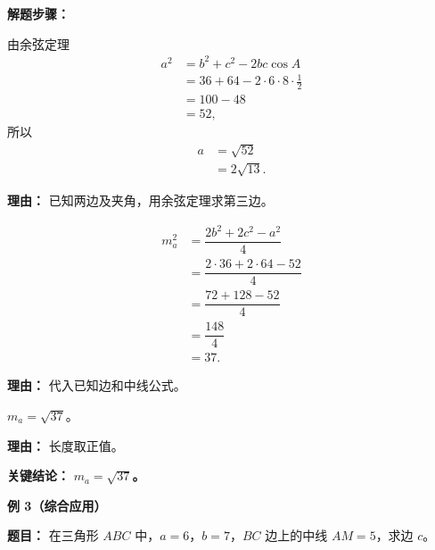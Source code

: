 \begin{examplebox}
	\textbf{\textcolor{CExample}{解题步骤：}}
	\begin{description}[style=nextline, leftmargin=2.8em, labelsep=0.5em, itemsep=0.45em]
		\item[\textbf{第一步（求第三边）：}] 由余弦定理
			\[
				\begin{aligned}
					a^2 &= b^2 + c^2 - 2bc\cos A \\
					&= 36 + 64 - 2 \cdot 6 \cdot 8 \cdot \frac12 \\
					&= 100 - 48 \\
					&= 52,
			\end{aligned}
			\]
			所以
			\[
				\begin{aligned}
					a &= \sqrt{52} \\
					&= 2\sqrt{13}.
			\end{aligned}
			\]
			\par\textbf{理由：} 已知两边及夹角，用余弦定理求第三边。
		\item[\textbf{第二步（套用中线公式）：}]
			\[
				\begin{aligned}
					m_a^2 &= \dfrac{2b^2+2c^2-a^2}{4} \\
					&= \dfrac{2\cdot36+2\cdot64-52}{4} \\
					&= \dfrac{72+128-52}{4} \\
					&= \dfrac{148}{4} \\
					&= 37.
			\end{aligned}
			\]
			\par\textbf{理由：} 代入已知边和中线公式。
		\item[\textbf{第三步（开方取正）：}] $m_a = \sqrt{37}$。
			\par\textbf{理由：} 长度取正值。
	\end{description}

	\textbf{\textcolor{CExample}{关键结论：}}
	\textbf{$m_a = \sqrt{37}$。}

	\medskip
	\textbf{\textcolor{CExample}{例 3（综合应用）}}

	\textbf{\textcolor{CExample}{题目：}}
	在三角形 $ABC$ 中，$a=6$，$b=7$，$BC$ 边上的中线 $AM = 5$，求边 $c$。


\end{examplebox}
